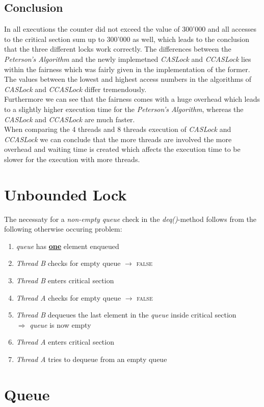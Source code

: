 \documentclass{article}
\begin{document}
\begin{adjustwidth}{2em}{2em}
		\subsection{Conclusion}
		\begin{adjustwidth}{2em}{2em}
			In all executions the counter did not exceed the value of 300'000 and all accesses to the critical section sum up to 300'000 as well, which leads to the conclusion that the three different locks work correctly. The differences between the \textit{Peterson's Algorithm} and the newly implemetned \textit{CASLock} and \textit{CCASLock} lies within the fairness which was fairly given in the implementation of the former. The values between the lowest and highest access numbers in the algorithms of \textit{CASLock} and \textit{CCASLock} differ tremendously. \\
			Furthermore we can see that the fairness comes with a huge overhead which leads to a slightly higher execution time for the \textit{Peterson's Algorithm}, whereas the \textit{CASLock} and \textit{CCASLock} are much faster. \\
			When comparing the 4 threads and 8 threads execution of \textit{CASLock} and \textit{CCASLock} we can conclude that the more threads are involved the more overhead and waiting time is created which affects the execution time to be slower for the execution with more threads.
		\end{adjustwidth}
	\end{adjustwidth}
	\newpage
    \section{Unbounded Lock}
    \begin{adjustwidth}{2em}{2em}
    	The necessaty for a \textit{non-empty queue} check in the \textit{deq()}-method follows from the following otherwise occuring problem:
    	\begin{enumerate}[-]
    		\item \textit{queue} has \underline{\textbf{one}} element enqueued
    		\item \textit{Thread B} checks for empty queue $\rightarrow$ \textsc{false}
    		\item \textit{Thread B} enters critical section
    		\item \textit{Thread A} checks for empty queue $\rightarrow$ \textsc{false}
    		\item \textit{Thread B} dequeues the last element in the \textit{queue} inside critical section \\
    		$\Rightarrow$ \textit{queue} is now empty
    		\item \textit{Thread A} enters critical section
    		\item \textit{Thread A} tries to dequeue from an empty queue
    	\end{enumerate}
    \end{adjustwidth}
    
    \section{Queue}
    \begin{adjustwidth}{2em}{2em}
    \end{adjustwidth}    
\end{document}
